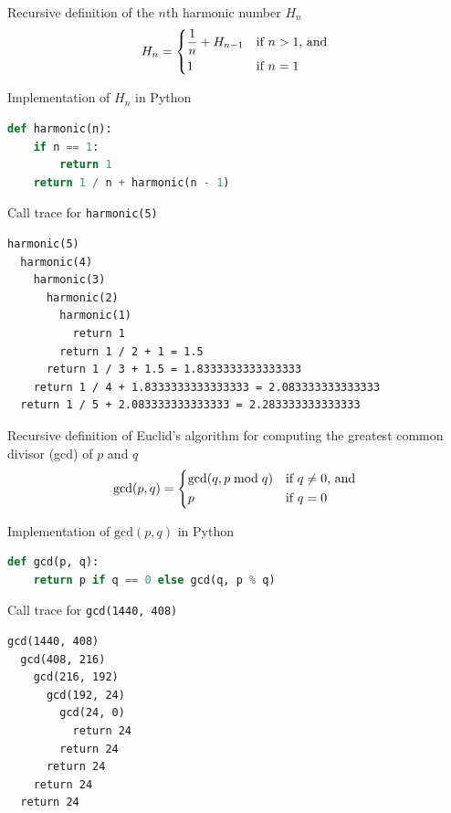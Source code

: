\documentclass[8pt,a4paper,compress]{beamer}
\begin{document}
\begin{frame}[fragile]
\pause

Recursive definition of the $n$th harmonic number $H_n$
\[
H_n = \begin{dcases*}
\frac{1}{n} + H_{n-1} & if $n > 1$, and \\
1       & if $n=1$
\end{dcases*}
\]

\pause
\bigskip

Implementation of $H_n$ in Python
 
\begin{lstlisting}[language=Python,style=focusin]
def harmonic(n):
    if n == 1:
        return 1
    return 1 / n + harmonic(n - 1)
\end{lstlisting}

\pause
\bigskip

Call trace for \lstinline{harmonic(5)}
\begin{lstlisting}[language={},style=focusin]
harmonic(5)
  harmonic(4)
    harmonic(3)
      harmonic(2)
        harmonic(1)
          return 1
        return 1 / 2 + 1 = 1.5
      return 1 / 3 + 1.5 = 1.8333333333333333
    return 1 / 4 + 1.8333333333333333 = 2.083333333333333
  return 1 / 5 + 2.083333333333333 = 2.283333333333333
\end{lstlisting}
\end{frame}

\begin{frame}[fragile]
\pause

Recursive definition of Euclid's algorithm for computing the greatest common divisor (gcd) of $p$ and $q$
\[
\text{gcd}(p, q) = \begin{dcases*}
\text{gcd}(q, p \bmod q) & if $q \neq 0$, and \\
p       & if $q = 0$
\end{dcases*}
\]

\pause
\bigskip

Implementation of $\text{gcd}(p, q)$ in Python

\begin{lstlisting}[language=Python,style=focusin]
def gcd(p, q):
    return p if q == 0 else gcd(q, p % q) 
\end{lstlisting}

\pause
\bigskip

Call trace for \lstinline{gcd(1440, 408)}

\begin{lstlisting}[language={},style=focusin]
gcd(1440, 408)
  gcd(408, 216)
    gcd(216, 192)
      gcd(192, 24)
        gcd(24, 0)
          return 24
        return 24
      return 24
    return 24
  return 24
\end{lstlisting}
\end{frame}
\end{document}
